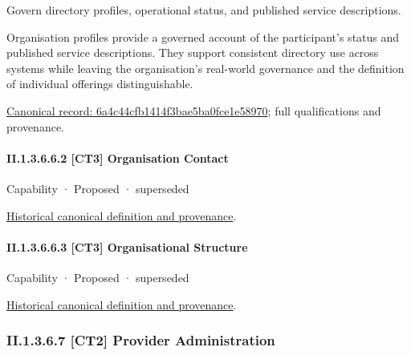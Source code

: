 Govern directory profiles, operational status, and published service descriptions.



Organisation profiles provide a governed account of the participant's status and published service descriptions. They support consistent directory use across systems while leaving the organisation's real-world governance and the definition of individual offerings distinguishable.


{\footnotesize \href{../../../../continuum/strategy/capability/feature/6a4c44cfb1414f3bae5ba0fce1e58970.md}{Canonical record: 6a4c44cfb1414f3bae5ba0fce1e58970}; full qualifications and provenance.}\par
\paragraph*{II.1.3.6.6.2 [CT3] Organisation Contact}
\label{navigation:II.1.3.6.6.2}

\label{element:b7f5108880eb429bb407c87a37b0e23f}
{\small Capability · Proposed · superseded}\par
\href{../../../../continuum/strategy/capability/b7f5108880eb429bb407c87a37b0e23f.md}{Historical canonical definition and provenance}.\par
\paragraph*{II.1.3.6.6.3 [CT3] Organisational Structure}
\label{navigation:II.1.3.6.6.3}

\label{element:19d211cf601c49e5a65665330d0c5c3d}
{\small Capability · Proposed · superseded}\par
\href{../../../../continuum/strategy/capability/19d211cf601c49e5a65665330d0c5c3d.md}{Historical canonical definition and provenance}.\par
\subsubsection*{II.1.3.6.7 [CT2] Provider Administration}
\label{navigation:II.1.3.6.7}


